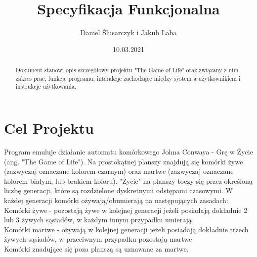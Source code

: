 \documentclass[11pt,a4paper]{report}
\title{\Huge Specyfikacja Funkcjonalna}
\author{Daniel Ślusarczyk i Jakub Łaba}
\date{10.03.2021}
\begin{document}
\maketitle

\renewcommand*\thesection{\arabic{section}} 

\begin{abstract}
Dokument stanowi opis szczegółowy projektu "The Game of Life" oraz związany z nim zakres prac, funkcje programu, interakcje zachodzące między system
a użytkownikiem i instrukcje użytkowania. 
\end{abstract}

\pagestyle{fancy}
\fancyhf{}
\setcounter{page}{0}

{
\fancyhead{} 
\fancyfoot{} 
}
\thispagestyle{empty} 
\tableofcontents 
\thispagestyle{empty}
\newpage

{
\fancyhead{} 
\fancyfoot[C]{\thepage}
}

\section{Cel Projektu}\label{sec:tekst}
Program emuluje działanie automatu komórkowego Johna Conwaya - Grę w Życie (ang. "The Game of Life").
Na prostokątnej planszy znajdują się komórki żywe (zazwyczaj oznaczane kolorem czarnym) oraz martwe (zazwyczaj oznaczane kolorem białym, lub brakiem koloru).
"Życie" na planszy toczy się przez określoną liczbę generacji, które są rozdzielone dyskretnymi odstępami czasowymi.
W każdej generacji komórki ożywają/obumierają na następujących zasadach:\\
Komórki żywe - pozostają żywe w kolejnej generacji jeżeli posiadają dokładnie 2 lub 3 żywych sąsiadów, w każdym innym przypadku umierają\\
Komórki martwe - ożywają w kolejnej generacji jeżeli posiadają dokładnie trzech żywych sąsiadów, w przeciwnym przypadku pozostają martwe\\
Komórki znadujące się poza planszą są uznawane za martwe. 

\end{document}

